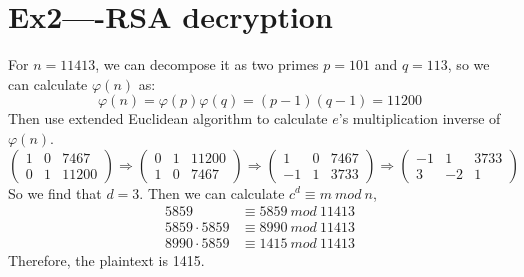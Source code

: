 \documentclass[12pt, a4paper]{article}
\begin{document}
\section*{Ex2----RSA decryption}
For $n = 11413$, we can decompose it as two primes $p = 101$ and $q = 113$, so we can calculate $\varphi(n)$ as:
$$\varphi(n) = \varphi(p)\varphi(q) = (p-1)(q-1) = 11200$$
Then use extended Euclidean algorithm to calculate $e$'s multiplication inverse of $\varphi(n)$.
$$
\begin{pmatrix} 1 & 0 & 7467\\ 0 & 1 & 11200\end{pmatrix} \Rightarrow
\begin{pmatrix} 0 & 1 & 11200\\ 1 & 0 & 7467\end{pmatrix} \Rightarrow
\begin{pmatrix} 1 & 0 & 7467\\ -1 & 1 & 3733\end{pmatrix} \Rightarrow
\begin{pmatrix} -1 & 1 & 3733\\ 3 & -2 & 1\end{pmatrix}
$$
So we find that $d = 3$.
Then we can calculate $c^d \equiv m\ mod\ n$, 
\begin{align*}
    5859 &\equiv 5859\ mod\ 11413\\
    5859\cdot 5859 &\equiv 8990\ mod\ 11413\\
    8990\cdot 5859 &\equiv 1415\ mod\ 11413
\end{align*}
Therefore, the plaintext is 1415.
\end{document}
